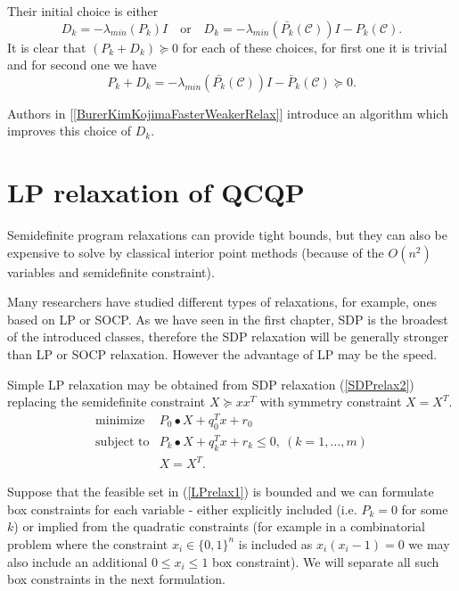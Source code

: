 \documentclass[12pt]{book}
\theoremstyle{definition}
\begin{document}
Their initial choice is either 
$$D_k = -\lambda_{min}(P_k)I  \ \ \ \mbox{ or } \ \ \  D_k =-\lambda_{min}(\bar{P_k}(\mathcal{C}))I - P_k(\mathcal{C}).$$
It is clear that $(P_k + D_k)\succeq 0$ for each of these choices, for first one it is trivial and for second one we have
$$P_k+D_k =  -\lambda_{min}(\bar{P_k}(\mathcal{C}))I - \bar{P}_k(\mathcal{C})\succeq 0.$$

Authors in [\ref{BurerKimKojimaFasterWeakerRelax}] introduce an algorithm which improves this choice of $D_k$.



\section{LP relaxation of QCQP}
\label{SectionLPRelaxationsOfQCQP}

Semidefinite program relaxations can provide tight bounds, but they can also be expensive to solve by classical interior point methods (because of the $O(n^2)$ variables and semidefinite constraint). 

Many researchers have studied different types of relaxations, for example, ones based on LP or SOCP. 
As we have seen in the first chapter, SDP is the broadest of the introduced classes, therefore the SDP relaxation will be generally stronger than LP or SOCP relaxation. However the advantage of LP may be the speed. 

Simple LP relaxation may be obtained from SDP relaxation (\ref{SDPrelax2}) replacing the semidefinite constraint $X\succeq xx^T$ with symmetry constraint $X = X^T$.
\begin{equation}
\label{LPrelax1} 
\begin{array}{ll}
\mbox{minimize}& P_0\bullet X + q_0^Tx + r_0\\
\mbox{subject to}& P_k\bullet X+ q_k^Tx + r_k \leq 0, \  (k = 1,\dots ,m)\\
& X = X^T.
\end{array} 
\end{equation}

Suppose that the feasible set in (\ref{LPrelax1}) is bounded and we can formulate box constraints for each variable - either explicitly included (i.e.  $P_k=0$ for some $k$) or implied from the quadratic constraints (for example in a combinatorial problem where the constraint $x_i\in \{0,1\}^n$ is included as $x_i(x_i-1) = 0$ we may also include an additional $0\leq x_i \leq 1$ box constraint). We will separate all such box constraints in the next formulation. 
\end{document}
